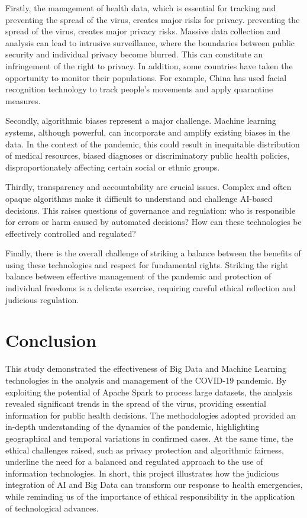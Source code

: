 \documentclass[12pt,oneside]{book} %
\begin{document}
Firstly, the management of health data, which is essential for tracking and
preventing the spread of the virus, creates major risks for privacy. preventing
the spread of the virus, creates major privacy risks. Massive data collection
and analysis can lead to intrusive surveillance, where the boundaries between
public security and individual privacy become blurred. This can constitute an
infringement of the right to privacy. In addition, some countries have taken
the opportunity to monitor their populations. For example, China has used
facial recognition technology to track people's movements and apply quarantine
measures.\newline

Secondly, algorithmic biases represent a major challenge. Machine learning
systems, although powerful, can incorporate and amplify existing biases in the
data. In the context of the pandemic, this could result in inequitable
distribution of medical resources, biased diagnoses or discriminatory public
health policies, disproportionately affecting certain social or ethnic
groups.\newline

Thirdly, transparency and accountability are crucial issues. Complex and often
opaque algorithms make it difficult to understand and challenge AI-based
decisions. This raises questions of governance and regulation: who is
responsible for errors or harm caused by automated decisions? How can these
technologies be effectively controlled and regulated?\newline

Finally, there is the overall challenge of striking a balance between the
benefits of using these technologies and respect for fundamental rights.
Striking the right balance between effective management of the pandemic and
protection of individual freedoms is a delicate exercise, requiring careful
ethical reflection and judicious regulation.

\newpage
\chapter{Conclusion}

This study demonstrated the effectiveness of Big Data and Machine Learning
technologies in the analysis and management of the COVID-19 pandemic. By
exploiting the potential of Apache Spark to process large datasets, the
analysis revealed significant trends in the spread of the virus, providing
essential information for public health decisions. The methodologies adopted
provided an in-depth understanding of the dynamics of the pandemic,
highlighting geographical and temporal variations in confirmed cases. At the
same time, the ethical challenges raised, such as privacy protection and
algorithmic fairness, underline the need for a balanced and regulated approach
to the use of information technologies. In short, this project illustrates how
the judicious integration of AI and Big Data can transform our response to
health emergencies, while reminding us of the importance of ethical
responsibility in the application of technological advances.
\end{document}
